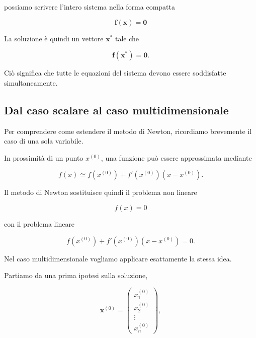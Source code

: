 possiamo scrivere l'intero sistema nella forma compatta

\begin{equation*}
    \mathbf{f}(\mathbf{x})=\mathbf{0}
\label{eq:nonlinear-vector-form}
\end{equation*}

La soluzione è quindi un vettore $\mathbf{x}^*$ tale che

\begin{equation*}
    \mathbf{f}(\mathbf{x}^*)=\mathbf{0}.
\end{equation*}

Ciò significa che tutte le equazioni del sistema devono essere
soddisfatte simultaneamente.


\subsection{Dal caso scalare al caso multidimensionale}

Per comprendere come estendere il metodo di Newton, ricordiamo
brevemente il caso di una sola variabile.

In prossimità di un punto $x^{(0)}$, una funzione può essere
approssimata mediante

\begin{equation*}
    f(x)
    \simeq
    f(x^{(0)})
    +
    f'(x^{(0)})(x-x^{(0)}).
\end{equation*}

Il metodo di Newton sostituisce quindi il problema non lineare

\begin{equation*}
    f(x)=0
\end{equation*}

con il problema lineare

\begin{equation*}
    f(x^{(0)})
    +
    f'(x^{(0)})(x-x^{(0)})
    =0.
\end{equation*}

Nel caso multidimensionale vogliamo applicare esattamente la stessa
idea.

Partiamo da una prima ipotesi sulla soluzione,

\begin{equation*}
    \mathbf{x}^{(0)}
    =
    \begin{pmatrix}
        x_1^{(0)}\\
        x_2^{(0)}\\
        \vdots\\
        x_n^{(0)}
    \end{pmatrix},
\end{equation*}

